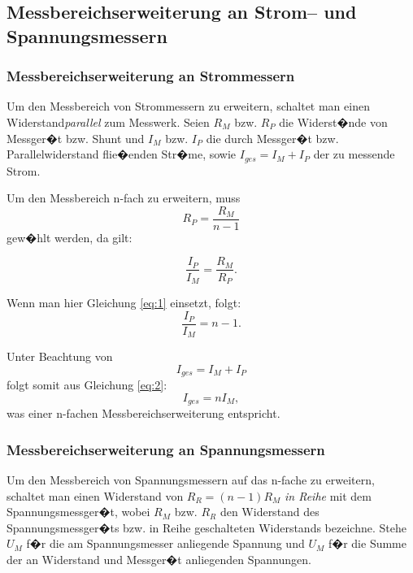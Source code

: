 \documentclass[10pt]{scrartcl}
\begin{document}
\subsection{Messbereichserweiterung an Strom-- und Spannungsmessern}

\subsubsection{Messbereichserweiterung an Strommessern}

Um den Messbereich von Strommessern zu erweitern, schaltet man einen Widerstand\emph{parallel} zum Messwerk. Seien $R_M$ bzw. $R_P$ die Widerst�nde von Messger�t bzw. Shunt und $I_M$ bzw. $I_P$ die durch Messger�t bzw. Parallelwiderstand flie�enden Str�me, sowie $I_{ges}=I_M+I_P$ der zu messende Strom.

Um den Messbereich n-fach zu erweitern, muss 
\begin{equation}
R_P=\frac{R_M}{n-1}
\label{eq:1}
\end{equation}
gew�hlt werden, da gilt:

\begin{displaymath}
\frac{I_P}{I_M}=\frac{R_M}{R_P}.
\end{displaymath}

Wenn man hier Gleichung \eqref{eq:1} einsetzt, folgt:
\begin{equation}
\frac{I_P}{I_M}=n-1.
\label{eq:2}
\end{equation}

Unter Beachtung von
\begin{displaymath}
I_{ges}=I_M+I_P
\end{displaymath}
folgt somit aus Gleichung \eqref{eq:2}:
\begin{displaymath}
I_{ges}=n I_M,
\end{displaymath}
was einer n-fachen Messbereichserweiterung entspricht.

\subsubsection{Messbereichserweiterung an Spannungsmessern}

Um den Messbereich von Spannungsmessern auf das n-fache zu erweitern, schaltet man einen Widerstand von $R_R=(n-1) R_M$ \emph{in Reihe} mit dem Spannungsmessger�t, wobei $R_M$ bzw. $R_R$ den Widerstand des Spannungsmessger�ts  bzw. in Reihe geschalteten Widerstands bezeichne. Stehe $U_M$ f�r die am Spannungsmesser anliegende Spannung und $U_M$ f�r die Summe der an Widerstand und Messger�t anliegenden Spannungen.
\end{document}
